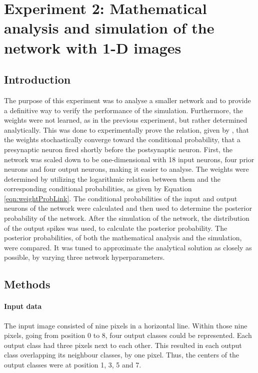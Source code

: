 \section{Experiment 2: Mathematical analysis and simulation of the network with 1-D images}
\label{section:1D}

\subsection{Introduction}

The purpose of this experiment was to analyse a smaller network and to provide a definitive way to verify the performance of the simulation. Furthermore, the weights were not learned, as in the previous experiment, but rather determined analytically. This was done to experimentally prove the relation, given by \citet{nessler}, that the weights stochastically converge toward the conditional probability, that a presynaptic neuron fired shortly before the postsynaptic neuron.
First, the network was scaled down to be one-dimensional with 18 input neurons, four prior neurons and four output neurons, making it easier to analyse. The weights were determined by utilizing the logarithmic relation between them and the corresponding conditional probabilities, as given by Equation \ref{eqn:weightProbLink}. The conditional probabilities of the input and output neurons of the network  were calculated and then used to determine the posterior probability of the network. After the simulation of the network, the distribution of the output spikes was used, to calculate the posterior probability. The posterior probabilities, of both the mathematical analysis and the simulation, were compared. It was tuned to approximate the analytical solution as closely as possible, by varying three network hyperparameters.

\subsection{Methods}

\paragraph{Input data}
The input image consisted of nine pixels in a horizontal line. Within those nine pixels, going from position 0 to 8, four output classes could be represented. Each output class had three pixels next to each other. This resulted in each output class overlapping its neighbour classes, by one pixel. Thus, the centers of the output classes were at position 1, 3, 5 and 7.
 
